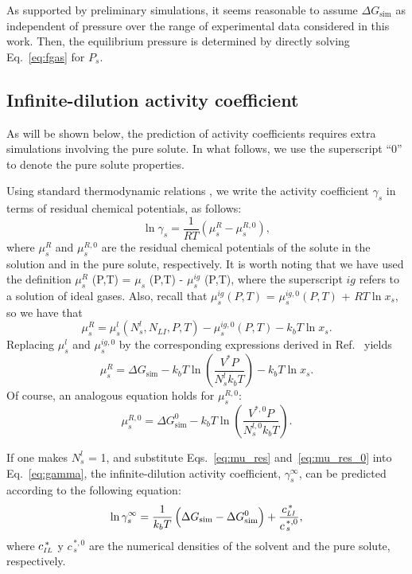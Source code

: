 \documentclass[3p,twocolumn]{elsarticle}
\begin{document}
As supported by preliminary simulations, it seems reasonable to assume $\Delta G_{\text{sim}}$ as independent of pressure over the range of experimental data considered in this work.
Then, the equilibrium pressure is determined by directly solving Eq.~\eqref{eq:fgas} for $P_s$.

\subsection*{Infinite-dilution activity coefficient}

As will be shown below, the prediction of activity coefficients requires extra simulations involving the pure solute.
In what follows, we use the superscript ``$0$'' to denote the pure solute properties.

Using standard thermodynamic relations \cite{Tester}, we write the activity coefficient $\gamma_s$ in terms of residual chemical potentials, as follows:
\begin{equation}
\label{eq:gamma}
\ln \gamma_s = \frac{1}{RT} (\mu_s^R - \mu_s^{R,0}),
\end{equation}
where $\mu_s^R$ and $\mu_s^{R,0}$ are the residual chemical potentials of the solute in the solution and in the pure solute, respectively.
It is worth noting that we have used the definition $\mu_s^{R}$ (P,T) = $\mu_s$ (P,T) - $\mu_s^{ig}$ (P,T), where the superscript $ig$ refers to a solution of ideal gases.
Also, recall that $\mu_s^{ig} (P,T)$ = $\mu_s^{ig,0} (P,T)$ + $RT \ln x_s$, so we have that
\begin{equation}
\mu_s^R = \mu_s^l(N_s^l,N_{LI},P,T) - \mu_s^{ig,0}(P,T) - k_b T \ln x_s.
\end{equation}
Replacing $\mu_s^{l}$ and $\mu_s^{ig,0}$ by the corresponding expressions derived in Ref.~\cite{Shirts_2003} yields
\begin{equation}
\label{eq:mu_res}
\mu_s^R = \Delta G_{\text{sim}} - k_b T \ln \left( \frac{V^{\ast} P}{N_s^l k_b T} \right) -  k_b T \ln x_s.
\end{equation}
Of course, an analogous equation holds for $\mu_s^{R,0}$:
\begin{equation}
\label{eq:mu_res_0}
\mu_s^{R,0} = \Delta G_{\text{sim}}^{0} - k_b T \ln \left( \frac{V^{\ast,0} P}{N_s^{l,0} k_b T} \right).
\end{equation}

If one makes $N_s^{l}$ = 1, and substitute Eqs.~\eqref{eq:mu_res} and~\eqref{eq:mu_res_0} into Eq.~\eqref{eq:gamma}, the infinite-dilution activity coefficient, $\gamma^{\infty}_s$, can be predicted according to the following equation:
\begin{equation}
\label{eq:gamma_inf}
\ln \gamma^{\infty}_s = \frac{1}{k_b T} \left( \Delta G_{\text{sim}} - \Delta G_{\text{sim}}^{0} \right) + \frac{c_{\scaleto{LI}{4pt}}^{\, \ast}}{c_{\, s}^{\, \ast,0}},
\end{equation}
where $c_{\scaleto{IL}{4pt}}^{\, \ast}$ y $c_{\, s}^{\, \ast,0}$ are the numerical densities of the solvent and the pure solute, respectively.
\end{document}
